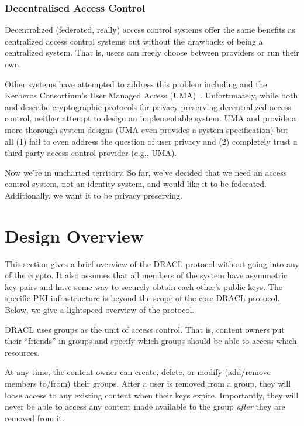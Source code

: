 \documentclass[pdftex,12pt,a4papaer]{report}
\begin{document}
\subsubsection{Decentralised Access Control}

Decentralized (federated, really) access control systems offer the same benefits
as centralized access control systems but without the drawbacks of being a
centralized system. That is, users can freely choose between providers or run
their own.

Other systems have attempted to address this problem including \cite{attrib}
\cite{privattrib} \cite{drbac} \cite{socnet} and the Kerberos Consortium's User
Managed Access (UMA)~\cite{uma}. Unfortunately, while both \cite{attrib} and
\cite{privattrib} describe cryptographic protocols for privacy preserving
decentralized access control, neither attempt to design an implementable system.
UMA\cite{uma} \cite{drbac} and \cite{socnet} provide a more thorough system
designs (UMA even provides a system specification) but all (1) fail to even address
the question of user privacy and (2) completely trust a third party access
control provider (e.g., UMA).

Now we're in uncharted territory. So far, we've decided that we need an access
control system, not an identity system, and would like it to be federated.
Additionally, we want it to be privacy preserving.


\section{Design Overview}

This section gives a brief overview of the DRACL protocol without going into any
of the crypto. It also assumes that all members of the system have asymmetric
key pairs and have some way to securely obtain each other's public keys. The
specific PKI infrastructure is beyond the scope of the core DRACL protocol.
Below, we give a lightspeed overview of the protocol.

DRACL uses groups as the unit of access control. That is, content owners put
their ``friends'' in groups and specify which groups should be able to access
which resources.

At any time, the content owner can create, delete, or modify (add/remove members
to/from) their groups. After a user is removed from a group, they will loose
access to any existing content when their keys expire. Importantly, they will
never be able to access any content made available to the group \emph{after}
they are removed from it.
  
\end{document}
